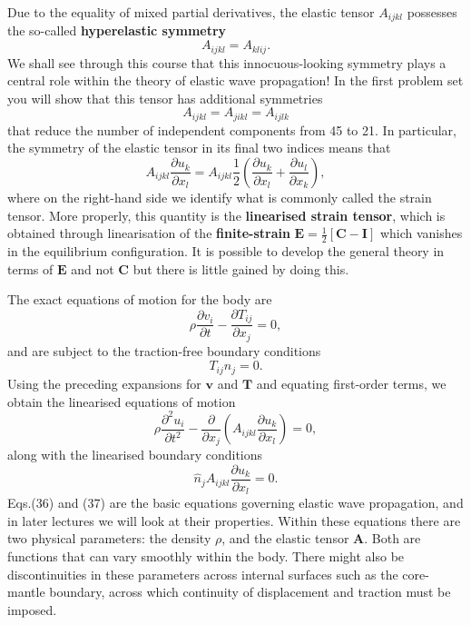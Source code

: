 \documentclass [a4paper,12pt]{paper}
\begin{document}
Due to the equality of mixed partial derivatives, the elastic tensor $A_{ijkl}$ 
possesses the so-called \textbf{hyperelastic symmetry}
\begin{equation}
A_{ijkl} = A_{klij}.
\end{equation}
We shall see through this course that this innocuous-looking symmetry plays a central role within the theory of elastic wave propagation!
 In the first problem set you will show that this tensor has additional symmetries
\begin{equation}
A_{ijkl} = A_{jikl} = A_{ijlk}
\end{equation}
that reduce the number of independent components from 45 to 21. In particular, the symmetry of the elastic tensor in its
final two indices means that
\begin{equation}
A_{ijkl}\frac{\partial u_{k}}{\partial x_{l}} = A_{ijkl}\frac{1}{2}\left(\frac{\partial u_{k}}{\partial x_{l}} + 
\frac{\partial u_{l}}{\partial x_{k}}\right),
\end{equation}
where on the right-hand side we identify what is commonly called the strain tensor. More properly, this quantity is the 
\textbf{linearised strain tensor}, which is obtained through linearisation of the \textbf{finite-strain} $\mathbf{E} = \frac{1}{2}[\mathbf{C} - 
\mathbf{I}]$ which vanishes in the equilibrium configuration. It is possible to develop the general theory 
in terms of $\mathbf{E}$ and not $\mathbf{C}$ but there is little gained by doing this.


The exact equations of motion for the body are
\begin{equation}
\rho\frac{\partial v_{i}}{\partial t} - \frac{\partial T_{ij}}{\partial x_{j}} = 0,
\end{equation}
and are subject to the traction-free boundary conditions
\begin{equation}
T_{ij}\hat{n}_{j} = 0.
\end{equation}
Using the preceding expansions for $\mathbf{v}$ and $\mathbf{T}$ and equating first-order terms, we obtain the linearised equations of motion
\begin{equation}
\rho\frac{\partial^2 u_{i}}{\partial t^2} - \frac{\partial}{\partial x_{j}}\left(A_{ijkl}\frac{\partial u_{k}}{\partial x_{l}}\right) = 0,
\end{equation}
along with the linearised boundary conditions
\begin{equation}
\hat{n}_{j}A_{ijkl}\frac{\partial u_{k}}{\partial x_{l}} = 0.
\end{equation}
Eqs.(36) and (37) are the basic equations governing elastic wave propagation, and in later lectures we will look at their properties. Within these equations there are two physical parameters: the density $\rho$, and the elastic tensor $\mathbf{A}$. Both are functions that can vary smoothly within the body. There might also be discontinuities in these parameters across internal surfaces such as the core-mantle boundary, across which continuity of displacement and traction must be imposed.
\end{document}
